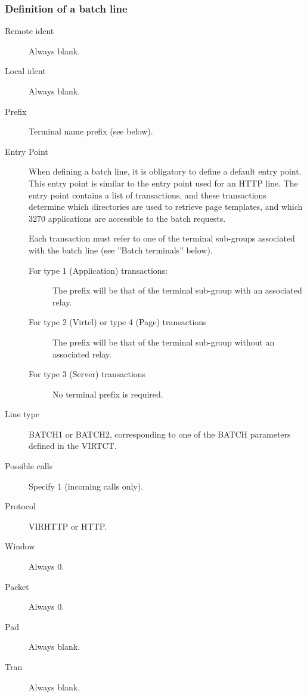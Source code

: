 \documentclass[letterpaper,10pt,english]{sphinxmanual}
\begin{document}


\subsubsection{Definition of a batch line}
\label{\detokenize{connectivity_guide:definition-of-a-batch-line}}\begin{description}
\item[{Remote ident}] \leavevmode
Always blank.

\item[{Local ident}] \leavevmode
Always blank.

\item[{Prefix}] \leavevmode
Terminal name prefix (see below).

\item[{Entry Point}] \leavevmode
When defining a batch line, it is obligatory to define a default entry point. This entry point is similar to the entry point used for an HTTP line. The entry point contains a list of transactions, and these transactions determine which directories are used to retrieve page templates, and which 3270 applications are accessible to the batch requests.

Each transaction must refer to one of the terminal sub-groups associated with the batch line (see ”Batch terminals” below).
\begin{description}
\item[{For type 1 (Application) transactions:}] \leavevmode
The prefix will be that of the terminal sub-group with an associated relay.

\item[{For type 2 (Virtel) or type 4 (Page) transactions}] \leavevmode
The prefix will be that of the terminal sub-group without an associated relay.

\item[{For type 3 (Server) transactions}] \leavevmode
No terminal prefix is required.

\end{description}

\item[{Line type}] \leavevmode
BATCH1 or BATCH2, corresponding to one of the BATCH parameters defined in the VIRTCT.

\item[{Possible calls}] \leavevmode
Specify 1 (incoming calls only).

\item[{Protocol}] \leavevmode
VIRHTTP or HTTP.

\item[{Window}] \leavevmode
Always 0.

\item[{Packet}] \leavevmode
Always 0.

\item[{Pad}] \leavevmode
Always blank.

\item[{Tran}] \leavevmode
Always blank.

\end{description}
\end{document}
